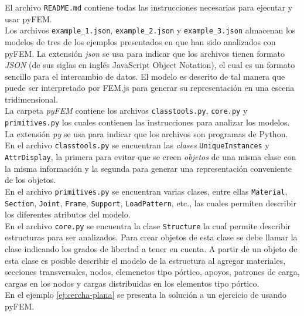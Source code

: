 El archivo \verb|README.md| contiene todas las instrucciones necesarias para ejecutar y usar pyFEM.\\


Los archivos \verb|example_1.json|, \verb|example_2.json| y \verb|example_3.json| almacenan los modelos de tres de los ejemplos presentados en \cite{escamilla1995microcomputadores} que han sido analizados con pyFEM. La extensión \emph{json} se usa para indicar que los archivos tienen formato \emph{JSON} (de sus siglas en inglés JavaScript Object Notation), el cual es un formato sencillo para el intercambio de datos. El modelo es descrito de tal manera que puede ser interpretado por FEM.js para generar su representación en una escena tridimensional. \\

La carpeta \emph{pyFEM} contiene los archivos \verb|classtools.py|, \verb|core.py| y \verb|primitives.py| los cuales contienen las instrucciones para analizar los modelos. La extensión \emph{py} se usa para indicar que los archivos son programas de Python.\\

En el archivo \verb|classtools.py| se encuentran las \emph{clases} \verb|UniqueInstances| y \verb|AttrDisplay|, la primera para evitar que se creen \emph{objetos} de una misma clase con la misma información y la segunda para generar una representación conveniente de los objetos.\\

En el archivo \verb|primitives.py| se encuentran varias clases, entre ellas \verb|Material|, \verb|Section|, \verb|Joint|, \verb|Frame|, \verb|Support|, \verb|LoadPattern|, etc., las cuales permiten describir los diferentes atributos del modelo.\\

En el archivo \verb|core.py| se encuentra la clase \verb|Structure| la cual permite describir estructuras para ser analizados. Para crear objetos de esta clase se debe llamar la clase indicando los grados de libertad a tener en cuenta. A partir de un objeto de esta clase es posible describir el modelo de la estructura al agregar materiales, secciones transversales, nodos, elemenetos tipo pórtico, apoyos, patrones de carga, cargas en los nodos y cargas distribuidas en los elementos tipo pórtico.\\

En el ejemplo \ref{ej:cercha-plana} se presenta la solución a un ejercicio de \cite{escamilla1995microcomputadores} usando pyFEM.
\pagebreak

